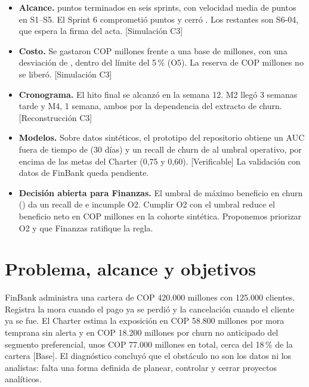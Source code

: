 \documentclass[10pt,a4paper]{article}
\newcommand{\rot}[1]{\textsf{\scriptsize\color{gris}[#1]}}
\begin{document}
\begin{itemize}
\item \textbf{Alcance.} \PuntosTotal{} puntos terminados en seis sprints, con velocidad media de \VelMedia{} puntos en S1--S5. El Sprint 6 comprometió \SseisComp{} puntos y cerró \SseisDone{}. Los \SseisPend{} restantes son S6-04, que espera la firma del acta. \rot{Simulación C3}
\item \textbf{Costo.} Se gastaron COP \GastoTotal{} millones frente a una base de \BaseTotal{} millones, con una desviación de \DesvCosto{}, dentro del límite del 5\,\% (O5). La reserva de COP \Reserva{} millones no se liberó. \rot{Simulación C3}
\item \textbf{Cronograma.} El hito final se alcanzó en la semana 12. M2 llegó 3 semanas tarde y M4, 1 semana, ambos por la dependencia del extracto de churn. \rot{Reconstrucción C3}
\item \textbf{Modelos.} Sobre datos sintéticos, el prototipo del repositorio obtiene un AUC fuera de tiempo de \AUCtreinta{} (30 días) y un recall de churn de \RecallOp{} al umbral operativo, por encima de las metas del Charter (0,75 y 0,60). \rot{Verificable} La validación con datos de FinBank queda pendiente.
\item \textbf{Decisión abierta para Finanzas.} El umbral de máximo beneficio en churn (\CorteCosto) da un recall de \RecallCosto{} e incumple O2. Cumplir O2 con el umbral \CorteOp{} reduce el beneficio neto en COP \BenefDif{} millones en la cohorte sintética. Proponemos priorizar O2 y que Finanzas ratifique la regla.
\end{itemize}

\section{Problema, alcance y objetivos}

FinBank administra una cartera de COP 420.000 millones con 125.000 clientes. Registra la mora cuando el pago ya se perdió y la cancelación cuando el cliente ya se fue. El Charter estima la exposición en COP 58.800 millones por mora temprana sin alerta y en COP 18.200 millones por churn no anticipado del segmento preferencial, unos COP 77.000 millones en total, cerca del 18\,\% de la cartera \rot{Base}. El diagnóstico concluyó que el obstáculo no son los datos ni los analistas: falta una forma definida de planear, controlar y cerrar proyectos analíticos.
\end{document}
